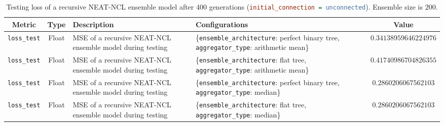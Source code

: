 \begin{table}[H]
    \centering
    \begin{tabular}{|c|c|p{4cm}|p{5cm}|c|}
        \hline
        Metric & Type & Description & Configurations & Value \\
        \hline
        \small\texttt{loss\_test} & Float & MSE of a recursive NEAT-NCL ensemble model during testing & \{\texttt{ensemble\_architecture}: perfect binary tree, \texttt{aggregator\_type}: arithmetic mean\} & $0.34138959646224976$ \\
        \hline
        \small\texttt{loss\_test} & Float & MSE of a recursive NEAT-NCL ensemble model during testing & \{\texttt{ensemble\_architecture}: flat tree, \texttt{aggregator\_type}: arithmetic mean\} & $0.41740986704826355$ \\
        \hline
        \small\texttt{loss\_test} & Float & MSE of a recursive NEAT-NCL ensemble model during testing & \{\texttt{ensemble\_architecture}: perfect binary tree, \texttt{aggregator\_type}: median\} & $0.2860206067562103$ \\
        \hline
        \small\texttt{loss\_test} & Float & MSE of a recursive NEAT-NCL ensemble model during testing & \{\texttt{ensemble\_architecture}: flat tree, \texttt{aggregator\_type}: median\} & $0.2860206067562103$ \\
        \hline
    \end{tabular}
    \caption{Testing loss of a recursive NEAT-NCL ensemble model after 400 generations (\lstinline[language=ini]|initial_connection = unconnected|). Ensemble size is $200$. }
    \label{table:experiment_6_neat_ncl_unconnected}
\end{table}


